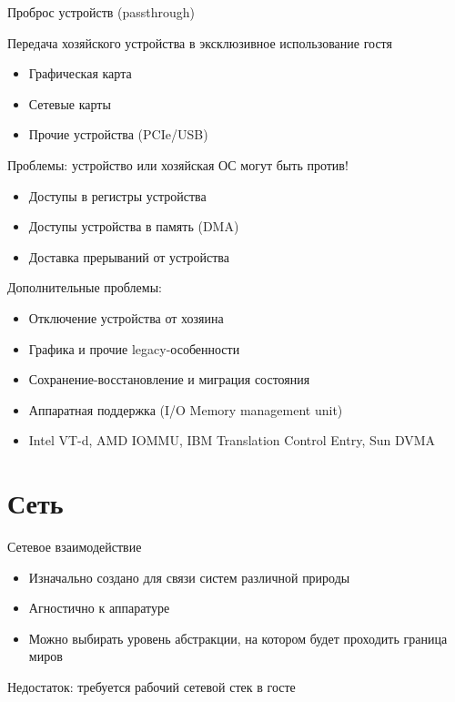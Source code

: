 \begin{frame}[allowframebreaks]{Проброс устройств (passthrough)}

Передача хозяйского устройства в эксклюзивное использование гостя

\begin{itemize}
\item Графическая карта
\item Сетевые карты
\item Прочие устройства (PCIe/USB)
\end{itemize}

Проблемы: устройство или хозяйская ОС могут быть против!

\begin{itemize}
\item Доступы в регистры устройства
\item Доступы устройства в память (DMA)
\item Доставка прерываний от устройства
\end{itemize}


Дополнительные проблемы:

\begin{itemize}
\item Отключение устройства от хозяина
\item Графика и прочие legacy-особенности
\item Сохранение-восстановление и миграция состояния
\end{itemize}


\begin{itemize}
\item Аппаратная поддержка (I/O Memory management unit)
\item Intel VT-d, AMD IOMMU, IBM Translation Control Entry, Sun DVMA
\end{itemize}

\end{frame}

\section{Сеть}

\begin{frame}{Сетевое взаимодействие}

\begin{itemize}
\item Изначально создано для связи систем различной природы
\item Агностично к аппаратуре
\item Можно выбирать уровень абстракции, на котором будет проходить граница миров
\end{itemize}

Недостаток: требуется рабочий сетевой стек в госте
\end{frame}

